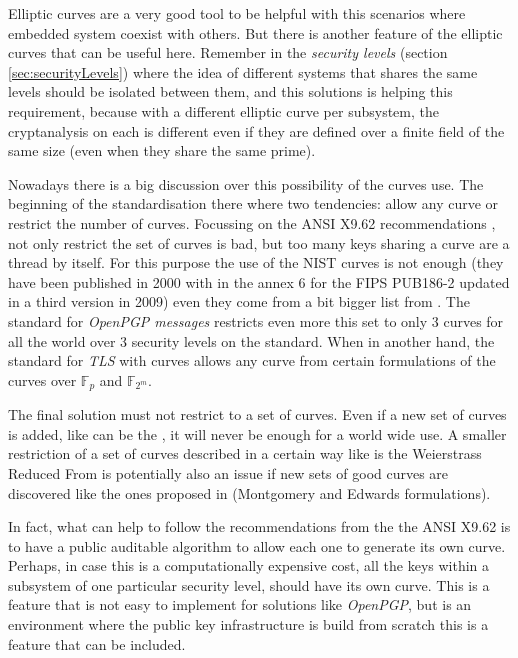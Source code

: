 \documentclass[10pt,a4paper,twoside]{llncs}
\begin{document}
Elliptic curves are a very good tool to be helpful with this scenarios where embedded system coexist with others. But there is another feature of the elliptic curves that can be useful here. Remember in the \emph{security levels} (section \ref{sec:securityLevels}) where the idea of different systems that shares the same levels should be isolated between them, and this solutions is helping this requirement, because with a different elliptic curve per subsystem, the cryptanalysis on each is different even if they are defined over  a finite field of the same size (even when they share the same prime).

Nowadays there is a big discussion over this possibility of the curves use. The beginning of the standardisation there where two tendencies: allow any curve or restrict the number of curves. Focussing on the ANSI X9.62 recommendations \cite{X9.62-1998}, not only restrict the set of curves is bad, but too many keys sharing a curve are a thread by itself. For this purpose the use of the NIST curves is not enough (they have been published in 2000 with in the annex 6 for the FIPS PUB186-2 updated in a third version \cite{NIST186-3} in 2009) even they come from a bit bigger list from \cite{sec2}. The standard for \emph{OpenPGP messages} \cite{rfc6637} restricts even more this set to only 3 curves for all the world over 3 security levels on the standard. When in another hand, the standard for \emph{TLS} with curves \cite{rfc4492} allows any curve from certain formulations of the curves over \ensuremath{\mathbb{F}_{p}} and \ensuremath{\mathbb{F}_{2^m}}.

The final solution must not restrict to a set of curves. Even if a new set of curves is added, like can be the \cite{brainpool}, it will never be enough for a world wide use. A smaller restriction of a set of curves described in a certain way like is the Weierstrass Reduced From is potentially also an issue if new sets of good curves are discovered like the ones proposed in \cite{cryptoeprint:2013:647} (Montgomery and Edwards formulations).

In fact, what can help to follow the recommendations from the the ANSI X9.62 is to have a public auditable algorithm to allow each one to generate its own curve. Perhaps, in case this is a computationally expensive cost, all the keys within a subsystem of one particular security level, should have its own curve. This is a feature that is not easy to implement for solutions like \emph{OpenPGP}, but is an environment where the public key infrastructure is build from scratch this is a feature that can be included.
\end{document}
